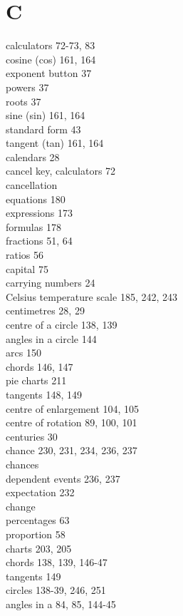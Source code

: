 \documentclass[10pt]{article}
\begin{document}
\section*{C}
calculators 72-73, 83\\
cosine (cos) 161, 164\\
exponent button 37\\
powers 37\\
roots 37\\
sine (sin) 161, 164\\
standard form 43\\
tangent (tan) 161, 164\\
calendars 28\\
cancel key, calculators 72\\
cancellation\\
equations 180\\
expressions 173\\
formulas 178\\
fractions 51, 64\\
ratios 56\\
capital 75\\
carrying numbers 24\\
Celsius temperature scale 185, 242, 243\\
centimetres 28, 29\\
centre of a circle 138, 139\\
angles in a circle 144\\
arcs 150\\
chords 146, 147\\
pie charts 211\\
tangents 148, 149\\
centre of enlargement 104, 105\\
centre of rotation 89, 100, 101\\
centuries 30\\
chance 230, 231, 234, 236, 237\\
chances\\
dependent events 236, 237\\
expectation 232\\
change\\
percentages 63\\
proportion 58\\
charts 203, 205\\
chords 138, 139, 146-47\\
tangents 149\\
circles 138-39, 246, 251\\
angles in a 84, 85, 144-45\\
\end{document}
